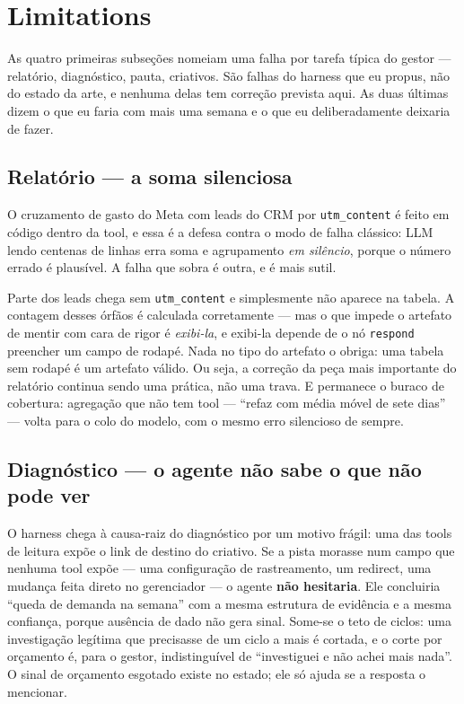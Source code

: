 \documentclass[10pt,twocolumn]{article}
\newcommand{\code}[1]{\texttt{\footnotesize #1}}
\begin{document}
\section{Limitations}

As quatro primeiras subseções nomeiam uma falha por tarefa típica do gestor --- relatório,
diagnóstico, pauta, criativos. São falhas do harness que eu propus, não do estado da arte, e
nenhuma delas tem correção prevista aqui. As duas últimas dizem o que eu faria com mais uma
semana e o que eu deliberadamente deixaria de fazer.

\subsection{Relatório --- a soma silenciosa}

O cruzamento de gasto do Meta com leads do CRM por \code{utm\_content} é feito em código
dentro da tool, e essa é a defesa contra o modo de falha clássico: LLM lendo centenas de
linhas erra soma e agrupamento \emph{em silêncio}, porque o número errado é plausível. A
falha que sobra é outra, e é mais sutil.

Parte dos leads chega sem \code{utm\_content} e simplesmente não aparece na tabela. A
contagem desses órfãos é calculada corretamente --- mas o que impede o artefato de mentir
com cara de rigor é \emph{exibi-la}, e exibi-la depende de o nó \code{respond} preencher um
campo de rodapé. Nada no tipo do artefato o obriga: uma tabela sem rodapé é um artefato
válido. Ou seja, a correção da peça mais importante do relatório continua sendo uma prática,
não uma trava. E permanece o buraco de cobertura: agregação que não tem tool --- ``refaz com
média móvel de sete dias'' --- volta para o colo do modelo, com o mesmo erro silencioso de
sempre.

\subsection{Diagnóstico --- o agente não sabe o que não pode ver}

O harness chega à causa-raiz do diagnóstico por um motivo frágil: uma das tools de leitura
expõe o link de destino do criativo. Se a pista morasse num campo que nenhuma tool expõe ---
uma configuração de rastreamento, um redirect, uma mudança feita direto no gerenciador ---
o agente \textbf{não hesitaria}. Ele concluiria ``queda de demanda na semana'' com a mesma
estrutura de evidência e a mesma confiança, porque ausência de dado não gera sinal. Some-se
o teto de ciclos: uma investigação legítima que precisasse de um ciclo a mais é cortada, e o
corte por orçamento é, para o gestor, indistinguível de ``investiguei e não achei mais
nada''. O sinal de orçamento esgotado existe no estado; ele só ajuda se a resposta o
mencionar.
\end{document}
